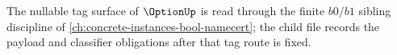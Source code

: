 The nullable tag surface of $\OptionUp$ is read through the finite $b0/b1$ sibling discipline of \autoref{ch:concrete-instances-bool-namecert}; the child file records the payload and classifier obligations after that tag route is fixed.


